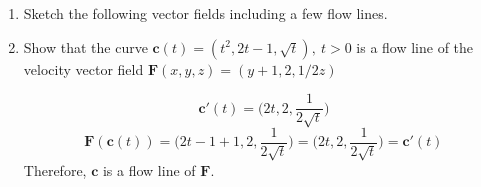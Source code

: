 \documentclass{article}
\begin{document}
\begin{enumerate}
\begin{enumerate}[resume]
                (see page 235, \#21(c))
        \end{enumerate}
    \newpage
    \item Sketch the following vector fields including a few flow lines.

    \newpage
    \item Show that the curve $\boldsymbol{c}(t) = ( t^2, 2t -1, \sqrt{t}),\ t > 0$ is a flow line of the velocity vector field $\boldsymbol{F}(x,y,z) = (y + 1,2,1/2z)$

        \[\boldsymbol{c}'(t) = \Big(2t, 2, \frac{1}{2\sqrt{t}}\Big) \]
        \[ \boldsymbol{F}(\boldsymbol{c}(t)) = \Big(2t - 1 + 1, 2, \frac{1}{2\sqrt{t}}\Big) = \Big(2t, 2, \frac{1}{2\sqrt{t}}\Big) = \boldsymbol{c}'(t) \]
        Therefore, $\boldsymbol{c}$ is a flow line of $\boldsymbol{F}$.


\end{enumerate}
\end{document}

